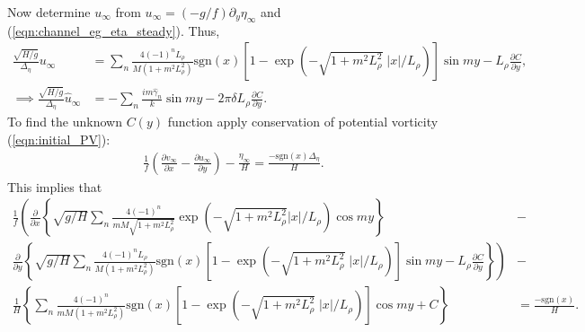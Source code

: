 \documentclass[10pt,reqno]{amsart}
\newcommand{\sign}{\mathrm{sgn}}
\begin{document}
Now determine $u_\infty$ from $u_\infty = (-g/f) \partial_y \eta_\infty$ and (\ref{eqn:channel_eg_eta_steady}).
Thus,
\begin{align}
\frac{\sqrt{H/g}}{\Delta_\eta}  u_\infty & = \sum_n \frac{4 {\left(-1\right)}^{n} L_\rho}{ M \left( 1 + m^2 L_\rho^2 \right)} \sign(x) \left[ 1 - \exp \left( - \sqrt{ 1 + m^2 L_\rho^2 } \; |x| /L_\rho \right) \right] \sin m y  -  L_\rho \frac{\partial C}{\partial y},
\label{eqn:channel_eg_u_steady} \\
\implies
\frac{\sqrt{H/g}}{\Delta_\eta}  \hat{u}_\infty & = - \sum_n \frac{i m \hat{\gamma}_n}{k}  \sin m y - 2 \pi \delta L_\rho \frac{\partial C}{\partial y} .
\end{align}
To find the unknown $C(y)$ function apply conservation of potential vorticity (\ref{eqn:initial_PV}):
\begin{align}
\frac{1}{f} \left( \frac{\partial v_\infty}{\partial x} - \frac{\partial u_\infty}{\partial y} \right) - \frac{\eta_\infty}{H} = \frac{ - \sign(x) \Delta_\eta}{H} .
\end{align}
This implies that
\begin{align}
\frac{1}{f} \left( \frac{\partial }{\partial x} \left \{ 
\sqrt{g/H} \sum_n \frac{4 {\left(-1\right)}^{n} }{m M \sqrt{ 1+  m^2 L_\rho^2 }} \exp \left( -\sqrt{1 + m^2 L_\rho^2 }  |x| / L_\rho \right) \cos m y  \right\} \right.  & - \nonumber  \\
\left. \frac{\partial }{\partial y} 
\left\{
\sqrt{g/H}  \sum_n \frac{4 {\left(-1\right)}^{n} L_\rho}{ M \left( 1 + m^2 L_\rho^2 \right)} \sign(x) \left[ 1 - \exp \left( - \sqrt{ 1 + m^2 L_\rho^2 } \; |x| /L_\rho \right) \right] \sin m y  -  L_\rho \frac{\partial C}{\partial y}
\right\}
\right) & - \nonumber \\
\frac{1}{H} \left\{
\sum_n \frac{4 {\left(-1\right)}^{n} }{m M \left( 1 + m^2 L_\rho^2 \right)} \sign(x) \left[ 1 - \exp \left( - \sqrt{ 1 + m^2 L_\rho^2 } \; |x| /L_\rho \right) \right] \cos m y + C
\right\} 
&= \frac{ - \sign(x) }{H}  . \nonumber
\end{align}
\end{document}
